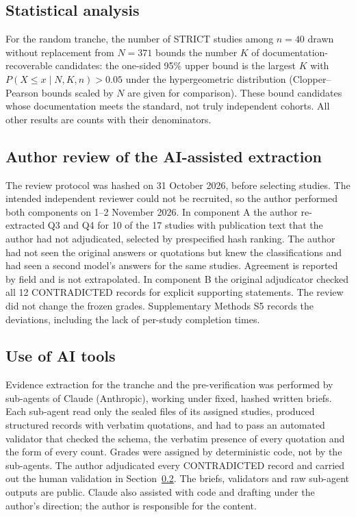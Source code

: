 \subsection{Statistical analysis}\label{sec:stats}

For the random tranche, the number of STRICT studies among $n = 40$ drawn without replacement from $N = 371$ bounds
the number $K$ of documentation-recoverable candidates: the one-sided 95\% upper bound is the largest $K$ with
$P(X \le x \mid N, K, n) > 0.05$ under the hypergeometric distribution (Clopper--Pearson bounds scaled by $N$ are given
for comparison). These bound candidates whose documentation meets the standard, not truly independent cohorts. All
other results are counts with their denominators.

\subsection{Author review of the AI-assisted extraction}\label{sec:validation}

The review protocol was hashed on 31 October 2026, before selecting studies. The intended independent reviewer
could not be recruited, so the author performed both components on 1--2 November 2026. In component A the author
re-extracted Q3 and Q4 for 10 of the 17 studies with publication text that the author had not adjudicated, selected by
prespecified hash ranking. The author had not seen the original answers or quotations but knew the classifications
and had seen a second model's answers for the same studies. Agreement is reported by field and is not extrapolated.
In component B the original adjudicator checked all 12 CONTRADICTED records for explicit supporting statements.
The review did not change the frozen grades. Supplementary Methods S5 records the deviations, including the lack of
per-study completion times.

\subsection{Use of AI tools}\label{sec:ai}

Evidence extraction for the tranche and the pre-verification was performed by sub-agents of Claude (Anthropic),
working under fixed, hashed written briefs. Each sub-agent read only the sealed files of its assigned studies,
produced structured records with verbatim quotations, and had to pass an automated validator that checked the schema,
the verbatim presence of every quotation and the form of every count. Grades were assigned by deterministic code, not
by the sub-agents. The author adjudicated every CONTRADICTED record and carried out the human validation in
Section~\ref{sec:validation}. The briefs, validators and raw sub-agent outputs are public. Claude also assisted with
code and drafting under the author's direction; the author is responsible for the content.

